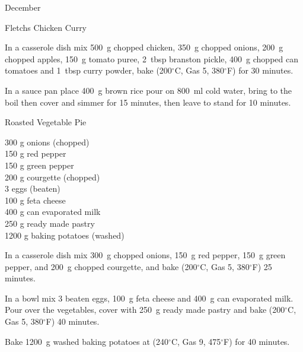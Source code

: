 \begin{menu}{December}
\begin{recipe}{2}{Fletchs Chicken Curry}
\begin{ingredients}
		\end{ingredients}
	
	
	
    \begin{instructions}
    \item 
        In a casserole dish mix
        500~g chopped chicken,
        350~g chopped onions,
        200~g chopped apples,
        150~g  tomato puree,
        2~tbsp  branston pickle,
        400~g chopped can tomatoes
        and
        1~tbsp  curry powder,
        bake (200$^{\circ}$C, Gas 5, 380$^{\circ}$F) for 30 minutes.
      \item 
    In a
    sauce pan
    place
    400~g  brown rice
    pour on
    800~ml  cold water,
    bring to the boil then cover and simmer for 15 minutes,
    then leave to stand for 10 minutes.
  
    \end{instructions}
    \end{recipe}%
  
    \begin{recipe}{2}{Roasted Vegetable Pie}%
		\begin{ingredients}
		300 g onions (chopped) \\
	150 g red pepper  \\
	150 g green pepper  \\
	200 g courgette (chopped) \\
	3  eggs (beaten) \\
	100 g feta cheese  \\
	400 g can evaporated milk  \\
	250 g ready made pastry  \\
	1200 g baking potatoes (washed) \\
	
		\end{ingredients}
	
	
    \begin{instructions}
    \item 
        In a casserole dish mix
        300~g chopped onions,
        150~g  red pepper,
        150~g  green pepper,
        and
        200~g chopped courgette,
        and bake (200$^{\circ}$C, Gas 5, 380$^{\circ}$F) 25 minutes.
      \item 
        In a bowl mix
        3 beaten eggs,
        100~g  feta cheese
        and
        400~g  can evaporated milk.
        Pour over the vegetables,
        cover with
        250~g  ready made pastry
        and bake (200$^{\circ}$C, Gas 5, 380$^{\circ}$F) 40 minutes.
      \item 
    Bake
    1200~g washed baking potatoes
    at
    (240$^{\circ}$C, Gas 9, 475$^{\circ}$F) for 40 minutes.
  

\end{instructions}
\end{recipe}
\end{menu}

